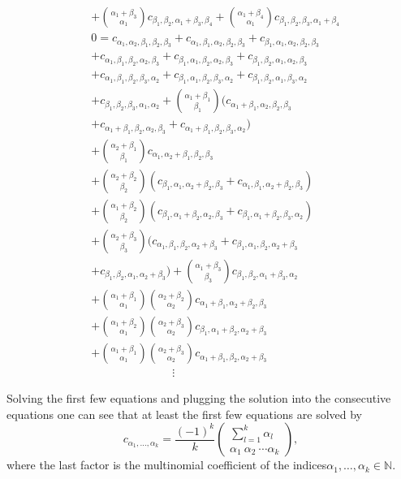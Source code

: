 \documentclass[b5paper,draft,openbib,12pt]{memoir}
\begin{document}
\begin{align*}
&+ \binom{\alpha_1+\beta_3}{\alpha_1} c_{\beta_1,\beta_2,\alpha_1+\beta_3,\beta_4}
+ \binom{\alpha_1+\beta_4}{\alpha_1} c_{\beta_1,\beta_2,\beta_3,\alpha_1+\beta_4}\\
&0= c_{\alpha_1,\alpha_2,\beta_1,\beta_2,\beta_3} 
+c_{\alpha_1,\beta_1,\alpha_2,\beta_2,\beta_3} 
+c_{\beta_1,\alpha_1,\alpha_2,\beta_2,\beta_3} \\
&+c_{\alpha_1,\beta_1,\beta_2,\alpha_2,\beta_3} 
+c_{\beta_1,\alpha_1,\beta_2,\alpha_2,\beta_3} 
+c_{\beta_1,\beta_2,\alpha_1,\alpha_2,\beta_3} \\
&+c_{\alpha_1,\beta_1,\beta_2,\beta_3,\alpha_2} 
+c_{\beta_1,\alpha_1,\beta_2,\beta_3,\alpha_2} 
+c_{\beta_1,\beta_2,\alpha_1,\beta_3,\alpha_2} \\
&+c_{\beta_1,\beta_2,\beta_3,\alpha_1,\alpha_2} 
+\binom{\alpha_1+\beta_1}{\beta_1} (c_{\alpha_1+\beta_1,\alpha_2,\beta_2,\beta_3}\\
&+c_{\alpha_1+\beta_1,\beta_2,\alpha_2,\beta_3}
+c_{\alpha_1+\beta_1,\beta_2,\beta_3,\alpha_2})\\
&+\binom{\alpha_2+\beta_1}{\beta_1} c_{\alpha_1,\alpha_2+\beta_1,\beta_2,\beta_3}\\
&+\binom{\alpha_2+\beta_2}{\beta_2} (c_{\beta_1,\alpha_1,\alpha_2+\beta_2,\beta_3}
+c_{\alpha_1,\beta_1,\alpha_2+\beta_2,\beta_3})\\
&+\binom{\alpha_1+\beta_2}{\beta_2} (c_{\beta_1,\alpha_1+\beta_2,\alpha_2,\beta_3}
+c_{\beta_1,\alpha_1+\beta_2,\beta_3,\alpha_2})\\
&+\binom{\alpha_2+\beta_3}{\beta_3}( c_{\alpha_1,\beta_1,\beta_2,\alpha_2+\beta_3}
+c_{\beta_1,\alpha_1,\beta_2,\alpha_2+\beta_3}\\
&+c_{\beta_1,\beta_2,\alpha_1,\alpha_2+\beta_3})
+\binom{\alpha_1+\beta_3}{\beta_3} c_{\beta_1,\beta_2,\alpha_1+\beta_3,\alpha_2}\\
&+\binom{\alpha_1+\beta_1}{\alpha_1} \binom{\alpha_2+\beta_2}{\alpha_2} 
c_{\alpha_1+\beta_1,\alpha_2+\beta_2,\beta_3}\\
&+\binom{\alpha_1+\beta_2}{\alpha_1} \binom{\alpha_2+\beta_3}{\alpha_2} 
c_{\beta_1,\alpha_1+\beta_2,\alpha_2+\beta_3}\\
&+\binom{\alpha_1+\beta_1}{\alpha_1} \binom{\alpha_2+\beta_3}{\alpha_2} 
c_{\alpha_1+\beta_1,\beta_2,\alpha_2+\beta_3}\\
& \hspace{3cm} \vdots
\end{align*}

Solving the first few equations and plugging the solution into the consecutive
 equations one can see that at least the first few equations are solved by 
\begin{equation}
c_{\alpha_1,\dots, \alpha_k} = \frac{(-1)^k}{k} \begin{pmatrix}\sum_{l=1}^k \alpha_l\\ \alpha_1\ \alpha_2 \ \cdots \alpha_k\end{pmatrix},
\end{equation}
where the last factor is the multinomial coefficient of the indices\linebreak \(\alpha_1,\dots, \alpha_k\in\mathbb{N}\).
\end{document}
